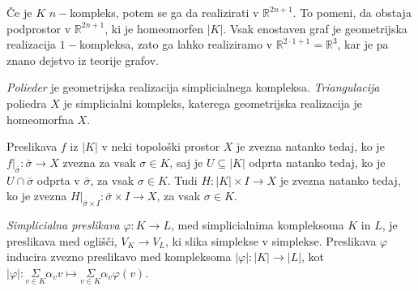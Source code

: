 \documentclass[mat1]{fmfdelo}
\DeclareRobustCommand{\si}{
    \bar{\sigma}}
\newcommand{\R}{\mathbb R}
\begin{document}
 \begin{opomba}
     Če je $K$ $n-$kompleks, potem se ga da realizirati v $\R^{2n+1}$. To pomeni, da obstaja podprostor v
     $\R^{2n+1}$, ki je homeomorfen $|K|$. Vsak enostaven graf je geometrijska realizacija $1-$kompleksa, zato ga 
     lahko realiziramo v $\R^{2\cdot 1 +1}=\R^{3}$, kar je pa znano dejstvo iz teorije grafov.
 \end{opomba}
 
 
 \emph{Polieder} je geometrijska realizacija simplicialnega kompleksa. \emph{Triangulacija} poliedra $X$ je simplicialni kompleks, katerega geometrijska realizacija je homeomorfna $X$.
 
Preslikava $f$ iz $|K|$ v neki topološki prostor $X$ je zvezna natanko tedaj, ko je $f|_{\bar{\sigma}}\colon  \bar{\sigma} \rightarrow X$ zvezna za vsak $\sigma\in K$,
saj je $U \subseteq |K|$ odprta natanko tedaj, ko je $U \cap 
\si$ odprta v $\si$, za vsak $\sigma \in K$.
Tudi $H\colon |K|\times I \rightarrow X$ je zvezna natanko tedaj, ko je zvezna $H|_{\si\times I}\colon \si\times I \rightarrow X$, za vsak $\sigma\in K$.
 
 
 \emph{Simplicialna preslikava} $\varphi \colon K \rightarrow L$, med 
 simplicialnima kompleksoma $K$ in $L$, je preslikava med 
 oglišči, $V_K \rightarrow V_L$, ki slika simplekse v 
 simplekse. Preslikava $\varphi$ inducira zvezno preslikavo med 
 kompleksoma $|\varphi| \colon |K| \rightarrow |L|$, kot $|\varphi|\colon 
 \underset{v \in K}{\Sigma}\alpha_v v \mapsto
 \underset{v \in K}{\Sigma}\alpha_v \varphi(v)$.
 
     
 
 
 
\end{document}
